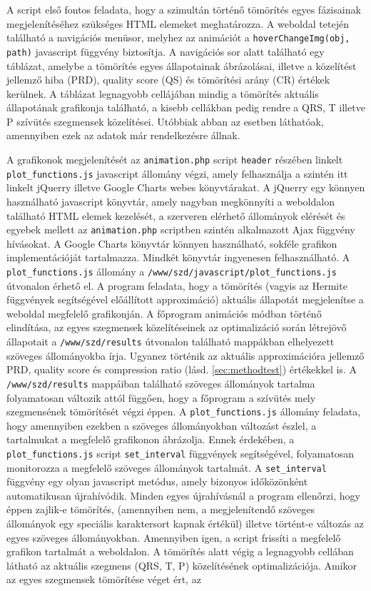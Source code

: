 \documentclass[oneside,titlepage,12pt,a4paper]{report}
\begin{document}
\par A script első fontos feladata, hogy a szimultán történő tömörítés egyes fázisainak megjelenítéséhez szükséges HTML elemeket meghatározza. A weboldal tetején található a navigációs menüsor, melyhez az animációt a  \texttt{hoverChangeImg(obj, path)} javascript függvény biztosítja. A navigációs sor alatt található egy táblázat, amelybe a tömörítés egyes állapotainak ábrázolásai, illetve a közelítést jellemző hiba (PRD), quality score (QS) és tömörítési arány (CR) értékek kerülnek. A táblázat legnagyobb cellájában mindig a tömörítés aktuális állapotának grafikonja található, a kisebb cellákban pedig rendre a QRS, T illetve P szívütés szegmensek közelítései. Utóbbiak abban az esetben láthatóak, amennyiben ezek az adatok már rendelkezésre állnak. 
\par A grafikonok megjelenítését az \texttt{animation.php} script \texttt{header} részében linkelt \texttt{plot\_functions.js} javascript állomány végzi, amely felhasználja a szintén itt linkelt jQuerry \cite{jquerry} illetve Google Charts \cite{gchart} webes könyvtárakat. A jQuerry egy könnyen használható javascript könyvtár, amely nagyban megkönnyíti a weboldalon található HTML elemek kezelését, a szerveren elérhető állományok elérését és egyebek mellett az \texttt{animation.php} scriptben szintén alkalmazott Ajax függvény hívásokat. A Google Charts könyvtár könnyen használható, sokféle grafikon implementációját tartalmazza. Mindkét könyvtár ingyenesen felhasználható. A \texttt{plot\_functions.js} állomány a \texttt{/www/szd/javascript/plot\_functions.js} útvonalon érhető el. A program feladata, hogy a tömörítés (vagyis az Hermite függvények segítségével előállított approximáció) aktuális állapotát megjelenítse a weboldal megfelelő grafikonján. A főprogram animációs módban történő elindítása, az egyes szegmensek közelítéseinek az optimalizáció során létrejövő állapotait a \texttt{/www/szd/results} útvonalon található mappákban elhelyezett szöveges állományokba írja. Ugyanez történik az aktuális approximációra jellemző PRD, quality score és compression ratio (lásd. \ref{sec:methodtest}) értékekkel is. A \texttt{/www/szd/results} mappáiban található szöveges állományok tartalma folyamatosan változik attól függően, hogy a főprogram a szívütés mely szegmensének tömörítését végzi éppen. A \texttt{plot\_functions.js} állomány feladata, hogy amennyiben ezekben a szöveges állományokban változást észlel, a tartalmukat  a megfelelő grafikonon ábrázolja. Ennek érdekében, a \texttt{plot\_functions.js} script \texttt{set\_interval} függvények segítségével, folyamatosan monitorozza a megfelelő szöveges állományok tartalmát. A \texttt{set\_interval} függvény egy olyan javascript metódus, amely bizonyos időközönként automatikusan újrahívódik. Minden egyes újrahívásnál a program ellenőrzi, hogy éppen zajlik-e tömörítés, (amennyiben nem, a megjelenítendő szöveges állományok egy speciális karaktersort kapnak értékül) illetve történt-e változás az egyes szöveges állományokban. Amennyiben igen, a script frissíti a megfelelő grafikon tartalmát a weboldalon. A tömörítés alatt végig a legnagyobb cellában látható az aktuális szegmens (QRS, T, P) közelítésének optimalizációja. Amikor az egyes szegmensek tömörítése véget ért, az 
\end{document}
